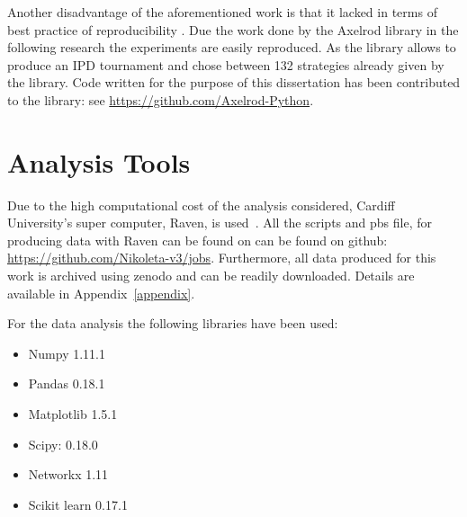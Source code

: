 Another disadvantage of the aforementioned work is that it lacked in terms of
best practice of reproducibility \cite{Axelrod1980a,Axelrod1980b,Stephens2002,Chong2004,Stewart2013}.
Due the work done by the Axelrod library \cite{axelrodproject} in the following research
the experiments are easily reproduced. As the library allows to produce an IPD
tournament and chose between 132 strategies already given by the library.
Code written for the purpose of this dissertation has been contributed to the
library: see \url{https://github.com/Axelrod-Python}.

\section{Analysis Tools}
Due to the high computational cost of the analysis considered, Cardiff
University's super computer, Raven, is used~\cite{raven}. All the scripts and pbs
file, for producing data with Raven can be found on can be found on github:
\url{https://github.com/Nikoleta-v3/jobs}. Furthermore, all data produced for
this work is archived using zenodo and can be readily downloaded. Details are
available in Appendix~\ref{appendix}.

For the data analysis the following libraries have been used:

\begin{multicols}{2}
	\begin{itemize}
		\item Numpy 1.11.1~\cite{numpy}
		\item Pandas 0.18.1~\cite{pandas}
		\item Matplotlib 1.5.1~\cite{matplot}
		\item Scipy: 0.18.0~\cite{scipy}
		\item Networkx 1.11~\cite{networkx}
    \item Scikit learn 0.17.1~\cite{scikit}
	\end{itemize}
\end{multicols}

